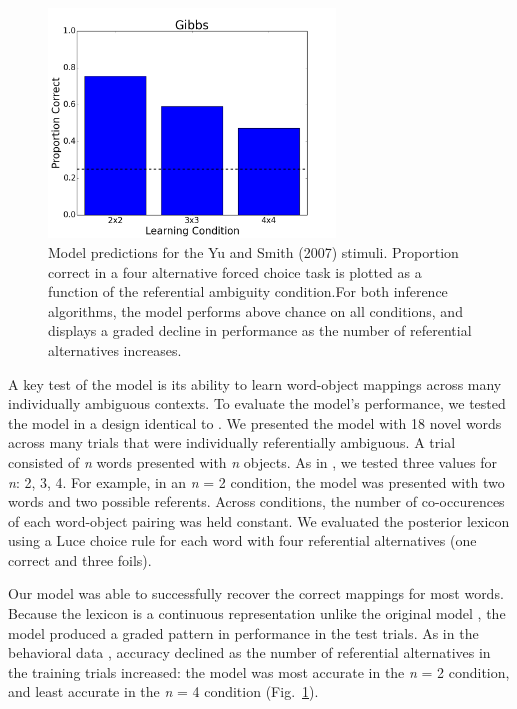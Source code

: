 \documentclass[man,noapacite,12pt]{apa2}
\begin{document}
\begin{figure}[h!]
\centering
  \includegraphics[width=3in]{figures/Gibbs.png}
\caption{Model predictions for the Yu and Smith (2007) stimuli. Proportion correct in a four alternative forced choice task is plotted as a function of the referential ambiguity condition.For both inference algorithms, the model performs above chance on all conditions, and displays a graded decline in performance as the number of referential alternatives increases.}
\label{fig:yu2007sim}
\end{figure}

A key test of the model is its ability to learn word-object mappings across many individually ambiguous contexts. To evaluate the model's performance, we tested the model in a design identical to . We presented the model with 18 novel words across many trials that were individually referentially ambiguous. A trial consisted of  {\it n} words presented with {\it n}  objects. As in , we tested three values for  {\it n}: 2, 3, 4. For example, in an {\it n} = 2 condition, the model was presented with two words and two possible referents. Across conditions, the number of co-occurences of each word-object pairing was held constant. We evaluated the posterior lexicon using a Luce choice rule \cite{luce1959} for each word with four referential alternatives (one correct and three foils). 

Our model was able to successfully recover the correct mappings for most words. Because the lexicon is a continuous representation unlike the original model \cite{frank2009}, the model produced a graded pattern in performance in the test trials. As in the behavioral data \cite{yu2007b}, accuracy declined as the number of referential alternatives in the training trials increased: the model was most accurate in the {\it n} = 2 condition, and least accurate in the  {\it n}  = 4 condition (Fig.~\ref{fig:yu2007sim}). 
\end{document}
